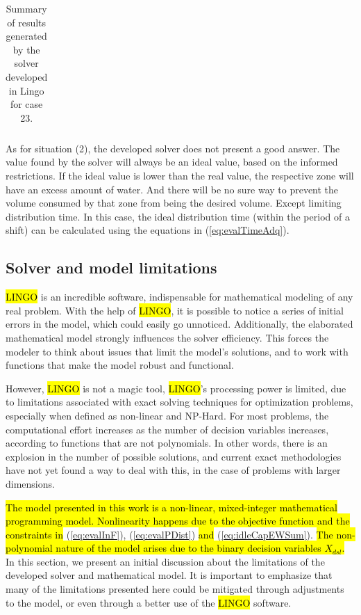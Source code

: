 \documentclass{singlecol}
\theoremstyle{TH}{
\newtheorem{lemma}{Lemma}
\newtheorem{theorem}[lemma]{Theorem}
\newtheorem{corrolary}[lemma]{Corrolary}
\newtheorem{conjecture}[lemma]{Conjecture}
\newtheorem{proposition}[lemma]{Proposition}
\newtheorem{claim}[lemma]{Claim}
\newtheorem{stheorem}[lemma]{Wrong Theorem}
\newtheorem{algorithm}{Algorithm}
}
\theoremstyle{THrm}{
\newtheorem{definition}{Definition}[section]
\newtheorem{question}{Question}[section]
\newtheorem{remark}{Remark}
\newtheorem{scheme}{Scheme}
}
\theoremstyle{THhit}{
\newtheorem{case}{Case}[section]
}
\begin{document}
\begin{table}[h!]
\begin{center}
\begin{small}
\begin{tabular}{ c r r r r r }
	\end{tabular}
\caption{Summary of results generated by the solver developed in Lingo for case 23.}
\label{tab:lingoEvaluationsCase23}
\end{small}
\end{center}
\end{table}

As for situation (2), the developed solver does not present a good answer. The value found by the solver will always be an ideal value, based on the informed restrictions. If the ideal value is lower than the real value, the respective zone will have an excess amount of water. And there will be no sure way to prevent the volume consumed by that zone from being the desired volume. Except limiting distribution time. In this case, the ideal distribution time (within the period of a shift) can be calculated using the equations in (\ref{eq:evalTimeAdq}). 

\subsection{Solver and model limitations}
\label{sec:limitations}

\hl{LINGO} is an incredible software, indispensable for mathematical modeling of any real problem. With the help of \hl{LINGO}, it is possible to notice a series of initial errors in the model, which could easily go unnoticed. Additionally, the elaborated mathematical model strongly influences the solver efficiency. This forces the modeler to think about issues that limit the model's solutions, and to work with functions that make the model robust and functional.

However, \hl{LINGO} is not a magic tool, \hl{LINGO}'s processing power is limited, due to limitations associated with exact solving techniques for optimization problems, especially when defined as non-linear and NP-Hard. For most problems, the computational effort increases as the number of decision variables increases, according to functions that are not polynomials. In other words, there is an explosion in the number of possible solutions, and current exact methodologies have not yet found a way to deal with this, in the case of problems with larger dimensions. 

\label{nonlinerarityExp}{\hl{The model presented in this work is a non-linear, mixed-integer mathematical programming model. Nonlinearity happens due to the objective function and the constraints in}} (\ref{eq:evalInF}), (\ref{eq:evalPDist}) \hl{and} (\ref{eq:idleCapEWSum}). \hl{The non-polynomial nature of the model arises due to the binary decision variables $X_{dsl}$.} In this section, we present an initial discussion about the limitations of the developed solver and mathematical model. It is important to emphasize that many of the limitations presented here could be mitigated through adjustments to the model, or even through a better use of the \hl{LINGO} software. 
\end{document}
